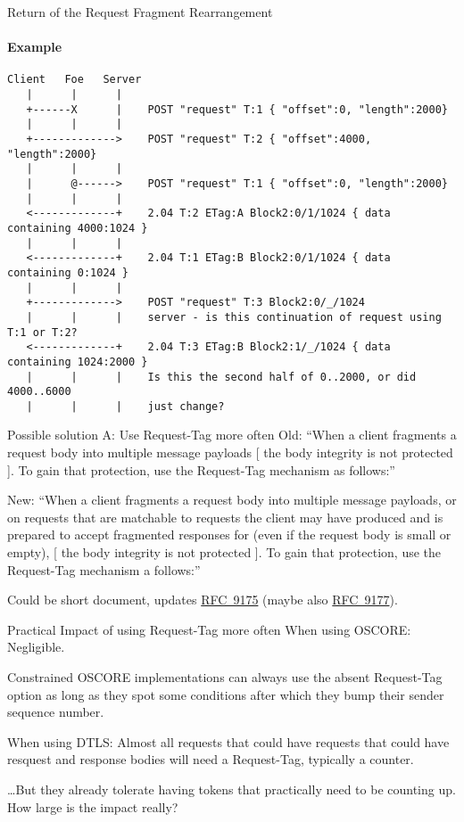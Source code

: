 \documentclass[aspectratio=169,colorlinks]{beamer}
\newcommand{\rfc}[1]{\href{https://datatracker.ietf.org/doc/html/rfc#1}{RFC~#1}}
\begin{document}
\begin{frame}[fragile]{Return of the Request Fragment Rearrangement}\small
	\framesubtitle{Example}
	\begin{verbatim}
Client   Foe   Server
   |      |      |
   +------X      |    POST "request" T:1 { "offset":0, "length":2000}
   |      |      |
   +------------->    POST "request" T:2 { "offset":4000, "length":2000}
   |      |      |
   |      @------>    POST "request" T:1 { "offset":0, "length":2000}
   |      |      |
   <-------------+    2.04 T:2 ETag:A Block2:0/1/1024 { data containing 4000:1024 }
   |      |      |
   <-------------+    2.04 T:1 ETag:B Block2:0/1/1024 { data containing 0:1024 }
   |      |      |
   +------------->    POST "request" T:3 Block2:0/_/1024
   |      |      |    server - is this continuation of request using T:1 or T:2?
   <-------------+    2.04 T:3 ETag:B Block2:1/_/1024 { data containing 1024:2000 }
   |      |      |    Is this the second half of 0..2000, or did 4000..6000
   |      |      |    just change?
	\end{verbatim}
\end{frame}

\begin{frame}{Possible solution A: Use Request-Tag more often}\large
	Old: ``When a client fragments a request body into multiple message payloads [ the body integrity is not protected ]. To gain that protection, use the Request-Tag mechanism as follows:''

	\bigskip

	New: ``\tiny{}When a client fragments a request body into multiple message payloads\large{}, or on requests that are matchable to requests the client may have produced and is prepared to accept fragmented responses for (even if the request body is small or empty), \tiny [ the body integrity is not protected ]. To gain that protection, use the Request-Tag mechanism a follows:''

	\large
	\bigskip

	Could be short document, updates \rfc{9175} (maybe also \rfc{9177}).
\end{frame}

\begin{frame}{Practical Impact of using Request-Tag more often}\large
	When using OSCORE: Negligible.

	Constrained OSCORE implementations can always use the absent Request-Tag option
	as long as they spot some conditions after which they bump their sender sequence number.

	\bigskip

	When using DTLS:
	Almost all requests that could have requests that could have resquest and response bodies
	will need a Request-Tag, typically a counter.

	\ldots But they already tolerate having tokens that practically need to be counting up. How large is the impact really?
\end{frame}
\end{document}
